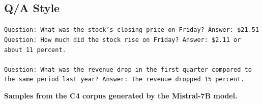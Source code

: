 \documentclass[table]{article}
\begin{document}
\subsection*{Q/A Style}
\begin{tcolorbox}[colback=gray!20, colframe=gray!75, rounded corners, sharp corners=northeast, sharp corners=southwest]
\texttt{Question: What was the stock's closing price on Friday? Answer: \$21.51 Question: How much did the stock rise on Friday? Answer: \$2.11 or about 11 percent.\\\\
Question: What was the revenue drop in the first quarter compared to the same period last year? Answer: The revenue dropped 15 percent.}
\end{tcolorbox}

\clearpage

\textbf{Samples from the C4 corpus generated by the Mistral-7B model.}
\end{document}
